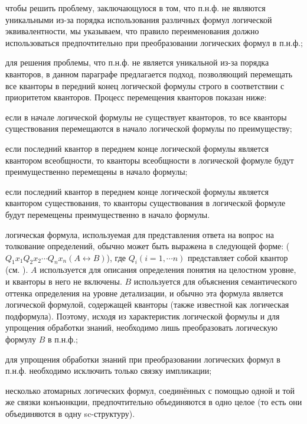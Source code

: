 \begin{textitemize}
	\item чтобы решить проблему, заключающуюся в том, что п.н.ф. не являются уникальными из-за порядка использования различных формул логической эквивалентности, мы указываем, что правило переименования должно использоваться предпочтительно при преобразовании логических формул в п.н.ф.;
	
	\item для решения проблемы, что п.н.ф. не является уникальной из-за порядка кванторов, в данном параграфе предлагается подход, позволяющий перемещать все кванторы в передний конец логической формулы строго в соответствии с приоритетом кванторов. Процесс перемещения кванторов показан ниже:
	
	\begin{textitemize}
		\item если в начале логической формулы не существует кванторов, то все кванторы существования перемещаются в начало логической формулы по преимуществу;
		
		\item если последний квантор в переднем конце логической формулы является квантором всеобщности, то кванторы всеобщности в логической формуле будут преимущественно перемещены в начало формулы;
		
		\item если последний квантор в переднем конце логической формулы является квантором существования, то кванторы существования в логической формуле будут перемещены преимущественно в начало формулы.
	\end{textitemize}
	
	\item логическая формула, используемая для представления ответа на вопрос на толкование определений, обычно может быть выражена в следующей форме: ($Q_{1}x_{1}Q_{2}x_{2}\cdots Q_{n}x_{n}(A\leftrightarrow B)$), где $Q_{i}\left ( i = 1, \cdots n \right )$ представляет собой квантор (см. ). $A$ используется для описания определения понятия на целостном уровне, и кванторы в него не включены. $B$ используется для объяснения семантического оттенка определения на уровне детализации, и обычно эта формула является логической формулой, содержащей кванторы (также известной как логическая подформула). Поэтому, исходя из характеристик логической формулы и для упрощения обработки знаний, необходимо лишь преобразовать логическую формулу $B$ в п.н.ф.;
	
	\item для упрощения обработки знаний при преобразовании логических формул в п.н.ф. необходимо исключить только связку импликации;
	
	\item несколько атомарных логических формул, соединённых с помощью одной и той же связки конъюнкции, предпочтительно объединяются в одно целое (то есть они объединяются в одну sc-структуру).
	
\end{textitemize}

